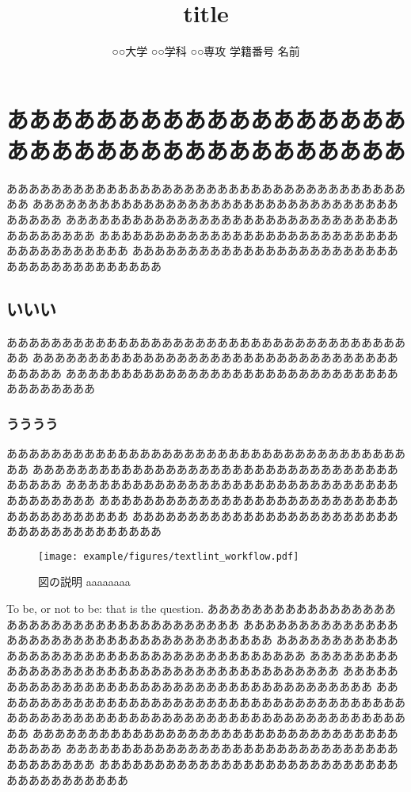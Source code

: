 \documentclass{classes/resume}
\title{
	title
}
\author{
	○○大学 ○○学科 ○○専攻 学籍番号 名前
}
\begin{document}
\maketitle

\section{ああああああああああああああああああああああああああああああああああああ}
ああああああああああああああああああああああああああああああああああああああ
ああああああああああああああああああああああああああああああああああああああ
ああああああああああああああああああああああああああああああああああああああ
ああああああああああああああああああああああああああああああああああああああ
ああああああああああああああああああああああああああああああああああああああ
\subsection{いいい}
ああああああああああああああああああああああああああああああああああああああ
ああああああああああああああああああああああああああああああああああああああ
ああああああああああああああああああああああああああああああああああああああ
\subsubsection{うううう}
ああああああああああああああああああああああああああああああああああああああ
ああああああああああああああああああああああああああああああああああああああ
ああああああああああああああああああああああああああああああああああああああ
ああああああああああああああああああああああああああああああああああああああ
ああああああああああああああああああああああああああああああああああああああ

\begin{figure}[htbp]
    \centering
    \texttt{[image: example/figures/textlint\_workflow.pdf]}
    \caption{図の説明 aaaaaaaa\cite{ref:nomura2022uwb}\cite{ref:青空文庫Aozo22:online}}
    \label{fig:fig1}
\end{figure}


To be, or not to be: that is the question.
ああああああああああああああああああああああああああああああああああああああ
ああああああああああああああああああああああああああああああああああああああ
ああああああああああああああああああああああああああああああああああああああ
ああああああああああああああああああああああああああああああああああああああ
ああああああああああああああああああああああああああああああああああああああ
ああああああああああああああああああああああああああああああああああああああ
ああああああああああああああああああああああああああああああああああああああ
ああああああああああああああああああああああああああああああああああああああ
ああああああああああああああああああああああああああああああああああああああ
ああああああああああああああああああああああああああああああああああああああ
\end{document}
